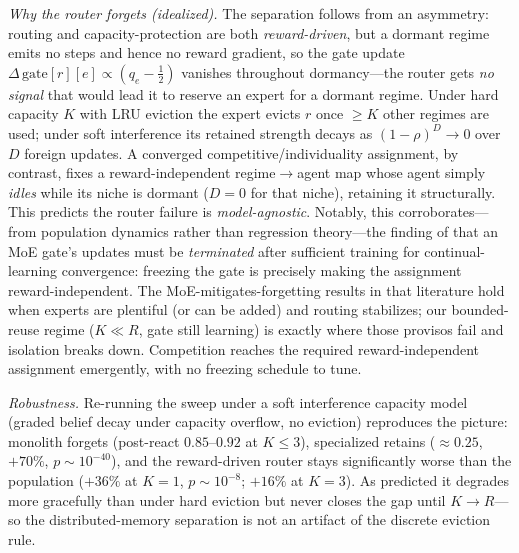 \documentclass[11pt,a4paper]{article}
\theoremstyle{definition}
\theoremstyle{plain}
\begin{document}
\begin{enumerate}
    \emph{Why the router forgets (idealized).} The separation follows from an
    asymmetry: routing and capacity-protection are both \emph{reward-driven}, but a
    dormant regime emits no steps and hence no reward gradient, so the gate update
    $\Delta\,\mathrm{gate}[r][e]\propto(q_e-\tfrac12)$ vanishes throughout dormancy---the
    router gets \emph{no signal} that would lead it to reserve an expert for a
    dormant regime. Under hard capacity $K$ with LRU eviction the expert evicts $r$
    once $\ge K$ other regimes are used; under soft interference its retained
    strength decays as $(1-\rho)^{D}\!\to0$ over $D$ foreign updates. A converged
    competitive/individuality assignment, by contrast, fixes a reward-independent
    regime$\to$agent map whose agent simply \emph{idles} while its niche is dormant
    ($D{=}0$ for that niche), retaining it structurally. This predicts the router
    failure is \emph{model-agnostic}. Notably, this corroborates---from population
    dynamics rather than regression theory---the finding of \cite{li2024moecl}
    that an MoE gate's updates must be \emph{terminated} after sufficient training
    for continual-learning convergence: freezing the gate is precisely making the
    assignment reward-independent. The MoE-mitigates-forgetting results in that
    literature hold when experts are plentiful (or can be added) and routing
    stabilizes; our bounded-reuse regime ($K \ll R$, gate still learning) is
    exactly where those provisos fail and isolation breaks down. Competition
    reaches the required reward-independent assignment emergently, with no
    freezing schedule to tune.

    \emph{Robustness.} Re-running the sweep under a soft interference capacity model
    (graded belief decay under capacity overflow, no eviction) reproduces the
    picture: monolith forgets (post-react $0.85$--$0.92$ at $K{\le}3$), specialized
    retains ($\approx0.25$, $+70\%$, $p\sim10^{-40}$), and the reward-driven router
    stays significantly worse than the population ($+36\%$ at $K{=}1$,
    $p\sim10^{-8}$; $+16\%$ at $K{=}3$). As predicted it degrades more gracefully
    than under hard eviction but never closes the gap until $K\to R$---so the
    distributed-memory separation is not an artifact of the discrete eviction rule.
\end{enumerate}
\end{document}
